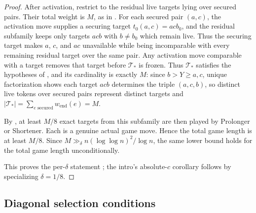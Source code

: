 \begin{proof}
After activation, restrict to the residual live targets lying over secured
pairs.  Their total weight is $M$, as in
.  For each secured pair $(a,c)$, the activation
move supplies a securing target $t_0(a,c)=acb_0$, and the residual subfamily
keeps only targets $acb$ with $b\ne b_0$ which remain live.  Thus the securing
target makes $a$, $c$, and $ac$ unavailable while being incomparable with every
remaining residual target over the same pair.  Any activation move comparable
with a target removes that target before $\mathcal T_*$ is frozen.  Thus
$\mathcal T_*$ satisfies the hypotheses of
, and its cardinality is exactly $M$: since
$b>Y\ge a,c$, unique factorization shows each target $acb$ determines the
triple $(a,c,b)$, so distinct live tokens over secured pairs represent
distinct targets and $|\mathcal T_*|=\sum_{e\text{ secured}}
w_{\mathrm{end}}(e)=M$.

By , at least $M/8$ exact targets from this
subfamily are then played by Prolonger or Shortener.  Each is a genuine actual
game move.  Hence the total game length is at least $M/8$.  Since
$M\gg_\delta n(\log\log n)^2/\log n$, the same lower bound holds for the
total game length unconditionally.

This proves the per-$\delta$ statement ; the intro's absolute-$c$
corollary follows by specializing $\delta=1/8$.
\end{proof}


\subsection{Diagonal selection conditions}\label{app:diagonal-selection-conditions}

